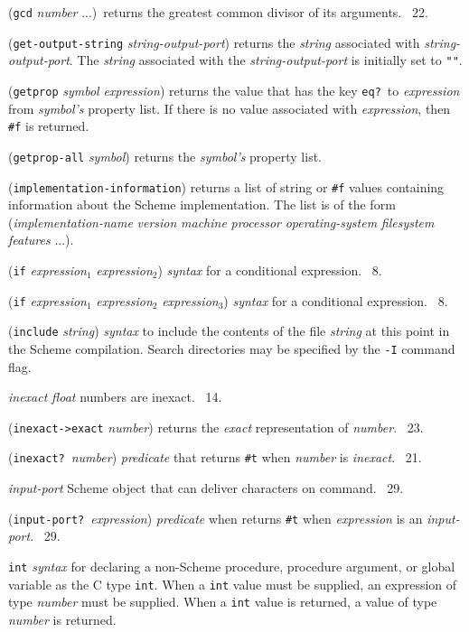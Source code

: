 \documentclass[10pt,twocolumn]{article}
\begin{document}
(\texttt{gcd} \emph{number} ...)\ returns the greatest common divisor
of its arguments.  \RRRRRS~22.

(\texttt{get-output-string} \emph{string-output-port}) returns the
\emph{string} associated with \emph{string-output-port}.  The
\emph{string} associated with the \emph{string-output-port} is
initially set to \texttt{""}.

(\texttt{getprop} \emph{symbol} \emph{expression}) returns the value
that has the key \texttt{eq?}\ to \emph{expression} from
\emph{symbol's} property list.  If there is no value associated with
\emph{expression}, then \texttt{\#f} is returned.

(\texttt{getprop-all} \emph{symbol}) returns the \emph{symbol's}
property list.

(\texttt{implementation-information}) returns a list of string or
\texttt{\#f} values containing information about the Scheme
implementation.  The list is of the form (\emph{implementation-name}
\emph{version} \emph{machine} \emph{processor} \emph{operating-system}
\emph{filesystem} \emph{features} ...).

(\texttt{if} \emph{expression}$_1$ \emph{expression}$_2$)
\emph{syntax} for a conditional expression.  \RRRRRS~8.

(\texttt{if} \emph{expression}$_1$ \emph{expression}$_2$
\emph{expression}$_3$) \emph{syntax} for a conditional expression.
\RRRRRS~8.

(\texttt{include} \emph{string}) \emph{syntax} to include the contents
of the file \emph{string} at this point in the Scheme compilation.
Search directories may be specified by the \texttt{-I} command flag.

\emph{inexact} \qquad \emph{float} numbers are inexact.  \RRRRRS~14.

(\texttt{inexact->exact} \emph{number}) returns the \emph{exact}
representation of \emph{number}.  \RRRRRS~23.

(\texttt{inexact?}\ \emph{number}) \emph{predicate} that returns
\texttt{\#t} when \emph{number} is \emph{inexact}.  \RRRRRS~21.

\emph{input-port} Scheme object that can deliver characters on
command.  \RRRRRS~29.

(\texttt{input-port?}\ \emph{expression}) \emph{predicate} when
returns \texttt{\#t} when \emph{expression} is an \emph{input-port}.
\RRRRRS~29.

\texttt{int} \emph{syntax} for declaring a non-Scheme procedure,
procedure argument, or global variable as the C type \texttt{int}.
When a \texttt{int} value must be supplied, an expression of type
\emph{number} must be supplied.  When a \texttt{int} value is
returned, a value of type \emph{number} is returned.
\end{document}
